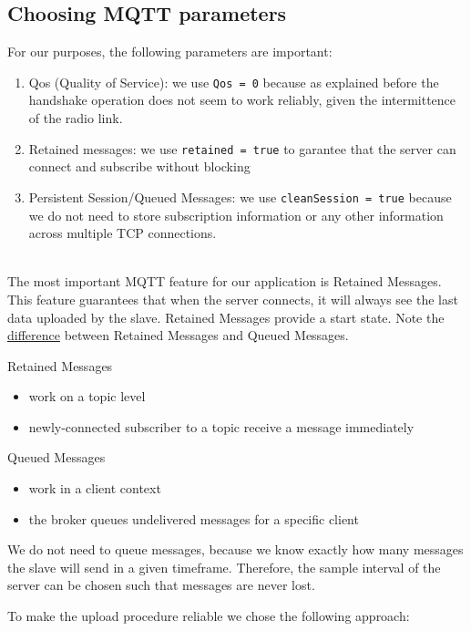 \subsection{Choosing MQTT parameters}

For our purposes, the following parameters are important:
\begin{enumerate}
    \item Qos (Quality of Service): we use \texttt{Qos = 0} because as explained before the
          handshake operation does  not seem to work reliably, given the intermittence of the radio link.
    \item Retained messages: we use \texttt{retained = true} to garantee that the server can connect and
          subscribe without blocking
    \item Persistent Session/Queued Messages: we use \texttt{cleanSession = true}
          because we do not need to store subscription information or any other information across multiple TCP connections.
\end{enumerate}
\ \\

The most important MQTT feature for our application is Retained Messages.
This feature guarantees that when the server connects, it will always see the last data uploaded by the slave.
Retained Messages
provide a start state.
Note the \href{https://www.youtube.com/watch?v=Ct5s4gXefn4&list=PLRkdoPznE1EMXLW6XoYLGd4uUaB6wB0wd&index=9}{difference}
between Retained Messages and Queued Messages.

Retained Messages
\begin{itemize}
    \item work on a topic level
    \item newly-connected subscriber to a topic receive a message immediately
\end{itemize}

Queued Messages
\begin{itemize}
    \item work in a client context
    \item the broker queues undelivered messages for a specific client
\end{itemize}

We do not need to queue messages, because we know exactly how many messages the slave will send in a given timeframe.
Therefore, the sample interval of the server can be chosen such that messages are never lost.


To make the upload procedure reliable we chose the following approach:


